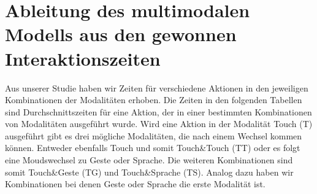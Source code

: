 \clearpage
\section[Herleitung des Modells]{Ableitung des multimodalen Modells aus den gewonnen Interaktionszeiten}\label{sec:Herleitung}
Aus unserer Studie haben wir Zeiten für verschiedene Aktionen in den jeweiligen Kombinationen der Modalitäten erhoben.
Die Zeiten in den folgenden Tabellen sind Durchschnittszeiten für eine Aktion, der in einer bestimmten Kombinationen von Modalitäten ausgeführt wurde.
Wird eine Aktion in der Modalität Touch (T) ausgeführt gibt es drei mögliche Modalitäten, die nach einem Wechsel kommen können.
Entweder ebenfalls Touch und somit Touch\&Touch (TT) oder es folgt eine Moudswechsel zu Geste oder Sprache.
Die weiteren Kombinationen sind somit Touch\&Geste (TG) und Touch\&Sprache (TS).
Analog dazu haben wir Kombinationen bei denen Geste oder Sprache die erste Modalität ist.

